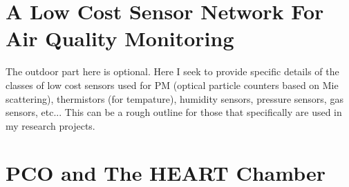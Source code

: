 



\section{A Low Cost Sensor Network For Air Quality Monitoring}
The outdoor part here is optional. Here I seek to provide specific details of the classes of low cost sensors used for PM (optical particle counters based on Mie scattering), thermistors (for tempature), humidity sensors, pressure sensors, gas sensors, etc... This can be a rough outline for those that specifically are used in my research projects.



\section{PCO and The HEART Chamber}









